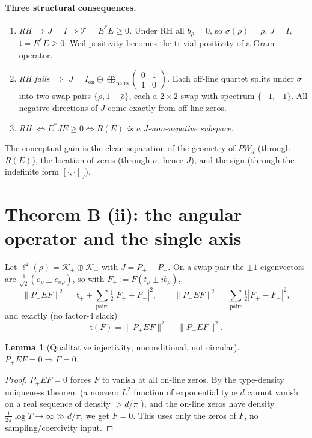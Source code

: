 \documentclass[11pt]{amsart}
\newtheorem{lemma}[theorem]{Lemma}
\theoremstyle{definition}
\theoremstyle{remark}
\newcommand{\PW}{\mathit{PW}_d}
\newcommand{\tform}{\mathfrak t}
\newcommand{\tplus}{\mathfrak t_+}
\newcommand{\Top}{\mathcal T}
\newcommand{\Norm}[1]{\lVert #1 \rVert}
\begin{document}
\paragraph{Three structural consequences.}
\begin{enumerate}[label=\textbf{(C\arabic*)}]
\item \emph{RH $\Rightarrow J=I\Rightarrow\Top=E^{*}E\ge0$.} Under RH all $b_\rho=0$, so
$\sigma(\rho)=\rho$, $J=I$, $\tform=E^{*}E\ge0$: Weil positivity becomes the trivial
positivity of a Gram operator.
\item \emph{RH fails $\Rightarrow$
$J=I_{\mathrm{on}}\oplus\bigoplus_{\text{pairs}}\left(\begin{smallmatrix}0&1\\1&0\end{smallmatrix}\right)$.}
Each off-line quartet splits under $\sigma$ into two swap-pairs $\{\rho,1-\bar\rho\}$,
each a $2\times2$ swap with spectrum $\{+1,-1\}$. All negative directions of $J$ come
exactly from off-line zeros.
\item \emph{RH $\iff E^{*}JE\ge0\iff R(E)$ is a $J$-non-negative subspace.}
\end{enumerate}
The conceptual gain is the clean separation of the geometry of $\PW$ (through $R(E)$),
the location of zeros (through $\sigma$, hence $J$), and the sign (through the indefinite
form $[\cdot,\cdot]_J$).

\section{Theorem B (ii): the angular operator and the single axis}\label{sec:angular}

Let $\ell^{2}(\rho)=\mathcal K_+\oplus\mathcal K_-$ with $J=P_+-P_-$. On a swap-pair the
$\pm1$ eigenvectors are $\tfrac1{\sqrt2}(e_\rho\pm e_{\sigma\rho})$, so with
$F_\pm:=F(t_\rho\pm ib_\rho)$,
\[
\Norm{P_+EF}^{2}=\tplus+\!\!\sum_{\text{pairs}}\tfrac12|F_++F_-|^{2},\qquad
\Norm{P_-EF}^{2}=\!\!\sum_{\text{pairs}}\tfrac12|F_+-F_-|^{2},
\]
and exactly (no factor-$4$ slack)
\begin{equation}\label{eq:split}
\boxed{\ \tform(F)=\Norm{P_+EF}^{2}-\Norm{P_-EF}^{2}.\ }
\end{equation}

\begin{lemma}[Qualitative injectivity; unconditional, not circular]\label{lem:inj}
$P_+EF=0\Rightarrow F=0$.
\end{lemma}
\begin{proof}
$P_+EF=0$ forces $F$ to vanish at all on-line zeros. By the type-density uniqueness
theorem (a nonzero $L^{2}$ function of exponential type $d$ cannot vanish on a real
sequence of density $>d/\pi$ \cite{Levin}), and the on-line zeros have density
$\tfrac1{2\pi}\log T\to\infty\gg d/\pi$, we get $F=0$. This uses only the zeros of $F$,
no sampling/coercivity input.
\end{proof}
\end{document}
